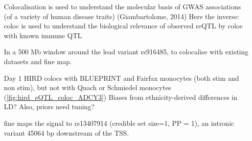 \begin{outline}


\1 Colocalisation is used to understand the molecular basis of GWAS associations (of a variety of human disease traits) (Giambartolome, 2014)
\1 Here the inverse: coloc is used to understand the biological relevance of observed reQTL by coloc with known immune QTL

\1 In a 500 Mb window around the lead  variant rs916485,  to colocalise with existing datasets and fine map.

\1 Day 1 HIRD colocs with BLUEPRINT and Fairfax monocytes (both stim and non stim), but not with Quach or Schmiedel monocytes (\autoref{fig:hird_eQTL_coloc_ADCY3})
\2 Biases from ethnicity-derived differences in LD?
\2 Also, priors need tuning?

\1  fine maps the signal to rs13407914 (credible set size=1, PP = 1), an intronic variant 45064 bp downstream of the TSS.


\end{outline}

